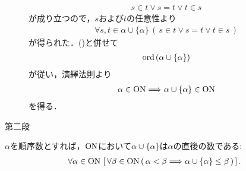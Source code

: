 \begin{sketch}
\begin{description}
\begin{align}
					s \in t \vee s = t \vee t \in s
				\end{align}
				が成り立つので，$s$および$t$の任意性より
				\begin{align}
					\forall s,t \in \alpha \cup \{\alpha\}\,
					\left(\, s \in t \vee s = t \vee t \in s\, \right)
				\end{align}
				が得られた．()と併せて
				\begin{align}
					\operatorname*{ord}\hspace{0.15em}(\alpha \cup \{\alpha\})
				\end{align}
				が従い，演繹法則より
				\begin{align}
					\alpha \in \mathrm{ON} \Longrightarrow \alpha \cup \{\alpha\} \in \mathrm{ON}
				\end{align}
				を得る．
				
			\item[第二段]
		\end{description}
	\end{sketch}
	
	\begin{screen}
		\begin{thm}[順序数は後者が直後の数となる]
			$\alpha$を順序数とすれば，$\mathrm{ON}$において$\alpha \cup \{\alpha\}$は$\alpha$の直後の数である:
			\begin{align}
				\forall \alpha \in \mathrm{ON}\, 
				\left[\, \forall \beta \in \mathrm{ON}\, (\, \alpha < \beta 
				\Longrightarrow \alpha \cup \{\alpha\} \leq \beta\, )
				\, \right].
			\end{align}
		\end{thm}
	\end{screen}
	
